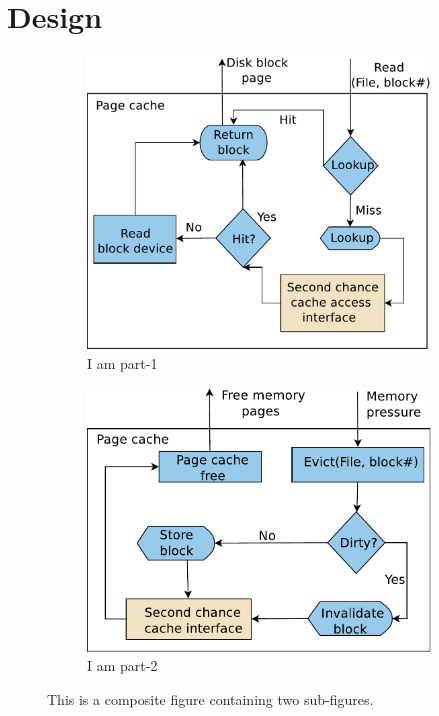
\section{Design}
\begin{figure}
\centering
\begin{subfigure}{0.41\linewidth}
\includegraphics[width=\columnwidth]{images/cc_get}
 \caption{I am part-1}
 \label{fig:part1}
\end{subfigure} \hfill
%
\begin{subfigure}{0.41\linewidth}
\includegraphics[width=\columnwidth]{images/evict}
 \caption{I am part-2}
 \label{fig:part2}
\end{subfigure} \hfill
%
\caption{This is a composite figure containing two sub-figures.}
\label{fig:composite}
\end{figure}

